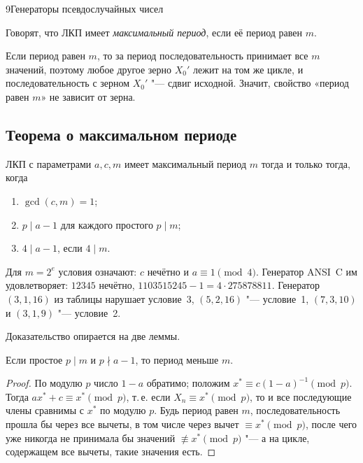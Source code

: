 \begin{lecture}{9}{Генераторы псевдослучайных чисел}
\begin{definition}
Говорят, что ЛКП имеет \emph{максимальный период}, если её период равен $m$.
\end{definition}

Если период равен $m$, то за период последовательность принимает все $m$ значений, поэтому
любое другое зерно $X_0'$ лежит на том же цикле, и последовательность с зерном $X_0'$ "--- сдвиг
исходной. Значит, свойство «период равен $m$» не зависит от зерна.

\subsection{Теорема о максимальном периоде}

\begin{theorem}\label{l9:thmA}
ЛКП с параметрами $a, c, m$ имеет максимальный период $m$ тогда и только тогда, когда
\begin{enumerate}
  \item $\gcd(c, m) = 1$;
  \item $p \mid a - 1$ для каждого простого $p \mid m$;
  \item $4 \mid a - 1$, если $4 \mid m$.
\end{enumerate}
\end{theorem}

Для $m = 2^e$ условия означают: $c$ нечётно и $a \equiv 1 \pmod 4$. Генератор ANSI~C им
удовлетворяет: $12345$ нечётно, $1103515245 - 1 = 4 \cdot 275878811$. Генератор $(3, 1, 16)$ из
таблицы нарушает условие~3, $(5, 2, 16)$ "--- условие~1, $(7, 3, 10)$ и $(3, 1, 9)$ "---
условие~2.

Доказательство опирается на две леммы.

\begin{lemma}\label{l9:fixed}
Если простое $p \mid m$ и $p \nmid a - 1$, то период меньше $m$.
\end{lemma}

\begin{proof}
По модулю $p$ число $1 - a$ обратимо; положим $x^* \equiv c (1 - a)^{-1} \pmod p$. Тогда
$a x^* + c \equiv x^* \pmod p$, т.\,е. если $X_n \equiv x^* \pmod p$, то и все последующие члены
сравнимы с $x^*$ по модулю $p$. Будь период равен $m$, последовательность прошла бы через все
вычеты, в том числе через вычет $\equiv x^* \pmod p$, после чего уже никогда не принимала бы
значений $\not\equiv x^* \pmod p$ "--- а на цикле, содержащем все вычеты, такие значения есть.
\end{proof}


\end{lecture}
